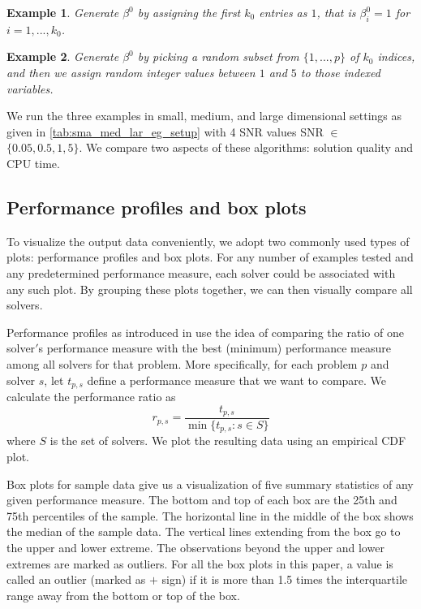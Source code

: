 \documentclass[10pt, letterpaper]{article}
\newtheorem{example}{Example}
\begin{document}
\begin{example}
Generate $\beta^{0}$ by assigning the first $k_{0}$ entries as $1$, that is $\beta_{i}^{0}=1$ for $i=1,...,k_{0}$. 
\end{example}

\begin{example}
Generate $\beta^{0}$ by picking a random subset from $\{1,...,p\}$ of $k_{0}$ indices, and then we assign random integer values between $1$ and $5$ to those indexed variables.  
\end{example}
We run the three examples in small, medium, and large dimensional settings as given in \tablename{ \ref{tab:sma_med_lar_eg_setup}} with 4 SNR values SNR $\in$ $ \{0.05, 0.5, 1, 5 \}$. 
We compare two aspects of these algorithms: solution quality and CPU time.
\subsection{Performance profiles and box plots}
To visualize the output data conveniently, we adopt two commonly used types of plots: performance profiles and box plots. For any number of examples tested and any predetermined performance measure, each solver could be associated with any such plot. By grouping these plots together, we can then visually compare all solvers.

Performance profiles as introduced in \cite{dolan2002perprof} use the idea of comparing the ratio of one solver$'$s performance measure with the best (minimum) performance measure among all solvers for that problem. More specifically, for each problem $p$ and solver $s$, let $t_{p,s}$ define a performance measure that we want to compare. We calculate the performance ratio as 
\[ r_{p,s}=\frac{t_{p,s}}{\min \{t_{p,s}:s\in S \} }\]
where $S$ is the set of solvers. We plot the resulting data using an empirical CDF plot. 

Box plots for sample data give us a visualization of five summary statistics of any given performance measure. The bottom and top of each box are the 25th and 75th percentiles of the sample. The horizontal line in the middle of the box shows the median of the sample data. The vertical lines extending from the box go to the upper and lower extreme. The observations beyond the upper and lower extremes are marked as outliers. For all the box plots in this paper, a value is called an outlier (marked as $+$ sign) if it is more than 1.5 times the interquartile range away from the bottom or top of the box.  
\end{document}
